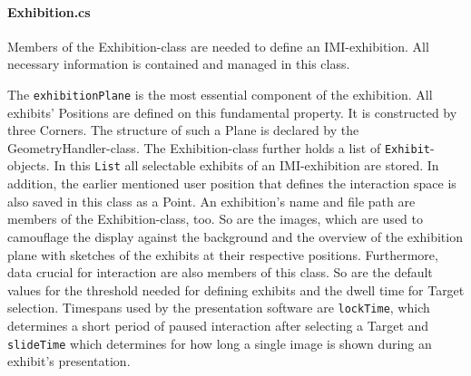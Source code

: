 %

\paragraph{Exhibition.cs} Members of the Exhibition-class are needed to define an \ac{IMI}-exhibition. All necessary information is contained and managed in this class.

The \texttt{exhibitionPlane} is the most essential component of the exhibition. All exhibits' Positions are defined on this fundamental property. It is constructed by three Corners. The structure of such a Plane is declared by the GeometryHandler-class. The Exhibition-class further holds a list of \texttt{Exhibit}-objects. In this \texttt{List} all selectable exhibits of an \ac{IMI}-exhibition are stored. In addition, the earlier mentioned user position that defines the interaction space is also saved in this class as a Point. An exhibition's name and file path are members of the Exhibition-class, too. So are the images, which are used to camouflage the display against the background and the overview of the exhibition plane with sketches of the exhibits at their respective positions. Furthermore, data crucial for interaction are also members of this class. So are the default values for the threshold needed for defining exhibits and the dwell time for Target selection. Timespans used by the presentation software are \texttt{lockTime}, which determines a short period of paused interaction after selecting a Target and \texttt{slideTime} which determines for how long a single image is shown during an exhibit's presentation.

